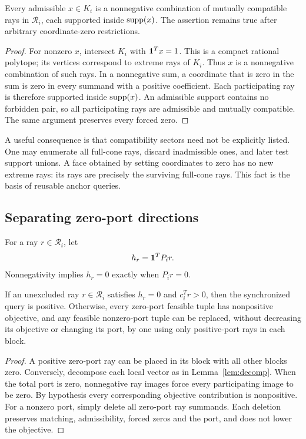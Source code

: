 \begin{lemma}
\label{lem:decomp}
Every admissible $x\in K_i$ is a nonnegative combination of mutually compatible rays in $\mathcal R_i$, each supported inside $\operatorname{supp}(x)$. The assertion remains true after arbitrary coordinate-zero restrictions.
\end{lemma}
\begin{proof}
For nonzero $x$, intersect $K_i$ with $\mathbf1^T x=1$. This is a compact rational polytope; its vertices correspond to extreme rays of $K_i$. Thus $x$ is a nonnegative combination of such rays. In a nonnegative sum, a coordinate that is zero in the sum is zero in every summand with a positive coefficient. Each participating ray is therefore supported inside $\operatorname{supp}(x)$. An admissible support contains no forbidden pair, so all participating rays are admissible and mutually compatible. The same argument preserves every forced zero.
\end{proof}

A useful consequence is that compatibility sectors need not be explicitly listed. One may enumerate all full-cone rays, discard inadmissible ones, and later test support unions. A face obtained by setting coordinates to zero has no new extreme rays: its rays are precisely the surviving full-cone rays. This fact is the basis of reusable anchor queries.

\subsection{Separating zero-port directions}
For a ray $r\in\mathcal R_i$, let
\[
 h_r=\mathbf1^TP_i r.
\]
Nonnegativity implies $h_r=0$ exactly when $P_i r=0$.

\begin{lemma}
\label{lem:zero}
If an unexcluded ray $r\in\mathcal R_i$ satisfies $h_r=0$ and $c_i^Tr>0$, then the synchronized query is positive. Otherwise, every zero-port feasible tuple has nonpositive objective, and any feasible nonzero-port tuple can be replaced, without decreasing its objective or changing its port, by one using only positive-port rays in each block.
\end{lemma}
\begin{proof}
A positive zero-port ray can be placed in its block with all other blocks zero. Conversely, decompose each local vector as in Lemma~\ref{lem:decomp}. When the total port is zero, nonnegative ray images force every participating image to be zero. By hypothesis every corresponding objective contribution is nonpositive. For a nonzero port, simply delete all zero-port ray summands. Each deletion preserves matching, admissibility, forced zeros and the port, and does not lower the objective.
\end{proof}

